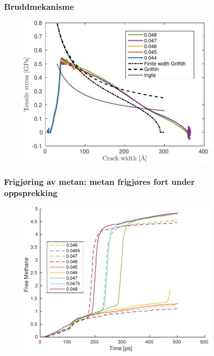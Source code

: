 \documentclass[utf8x, notes, graphics]{beamer}
\begin{document}
\begin{frame}
\frametitle{Bruddmekanisme}
\begin{figure}
\includegraphics[width=0.9\textwidth]{../figures/thesis/fracture_theory_compare.pdf}
\end{figure}

\end{frame}

\begin{frame}
\frametitle{Frigjøring av metan: metan frigjøres fort under oppsprekking}
\begin{figure}
\includegraphics[width=0.9\textwidth]{../figures/thesis/released_methane_temp.pdf}
\end{figure}
\end{frame}
\end{document}
